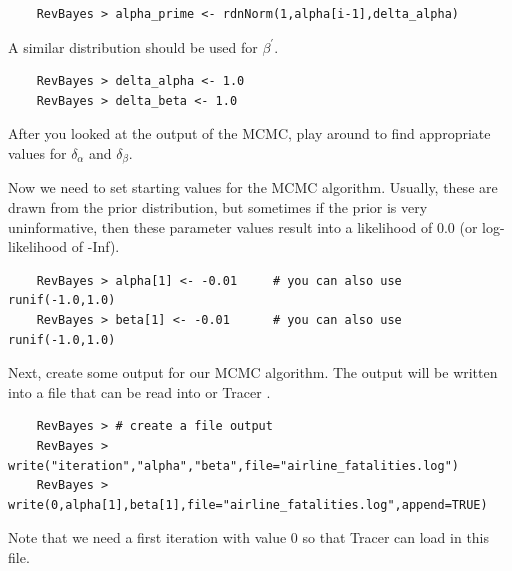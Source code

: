\documentclass[11pt]{article}
\begin{document}
{\tt \begin{snugshade*}
\begin{lstlisting}    
    RevBayes > alpha_prime <- rdnNorm(1,alpha[i-1],delta_alpha)
\end{lstlisting}
\end{snugshade*}}
A similar distribution should be used for $\beta^{\prime}$. 
{\tt \begin{snugshade*}
\begin{lstlisting}    
    RevBayes > delta_alpha <- 1.0
    RevBayes > delta_beta <- 1.0
\end{lstlisting}
\end{snugshade*}}
After you looked at the output of the MCMC, play around to find appropriate values for $\delta_{\alpha}$ and $\delta_{\beta}$.

Now we need to set starting values for the MCMC algorithm.
Usually, these are drawn from the prior distribution, but sometimes if the prior is very uninformative, then these parameter values result into a likelihood of 0.0 (or log-likelihood of -Inf).
{\tt \begin{snugshade*}
\begin{lstlisting}    
    RevBayes > alpha[1] <- -0.01     # you can also use runif(-1.0,1.0)
    RevBayes > beta[1] <- -0.01      # you can also use runif(-1.0,1.0)
\end{lstlisting}
\end{snugshade*}}
Next, create some output for our MCMC algorithm.
The output will be written into a file that can be read into \R or Tracer \citep{rambaut09}.
{\tt \begin{snugshade*}
\begin{lstlisting}    
    RevBayes > # create a file output
    RevBayes > write("iteration","alpha","beta",file="airline_fatalities.log")
    RevBayes > write(0,alpha[1],beta[1],file="airline_fatalities.log",append=TRUE)
\end{lstlisting}
\end{snugshade*}}
Note that we need a first iteration with value 0 so that Tracer can load in this file.
\end{document}
